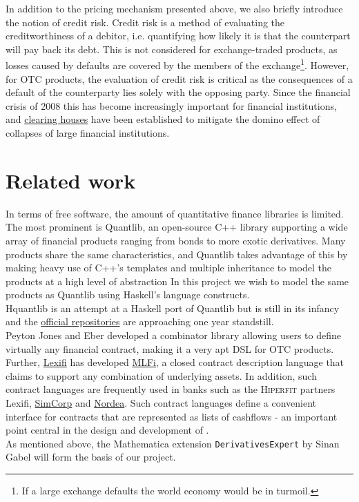 In addition to the pricing mechanism presented above, we also briefly introduce
the notion of credit risk. Credit risk is a method of evaluating the creditworthiness
of a debitor, i.e. quantifying how likely it is that the counterpart will pay back 
its debt. This is not considered for exchange-traded products, as losses 
caused by defaults are covered by the members of the exchange\footnote{If a large 
exchange defaults the world economy would be in turmoil.}. However, for OTC
products, the evaluation of credit risk is critical as the consequences of a 
default of the counterparty lies solely with the opposing party. Since the 
financial crisis of 2008 this has become increasingly important for financial 
institutions, and \href{http://www.lchclearnet.com/}{clearing houses} have
been established to mitigate the 
domino effect of collapses of large financial institutions.

\section{Related work}

In terms of free software, the amount of quantitative finance libraries is 
limited.
The most prominent is Quantlib, an open-source C++ library\cite{Ame2003}
supporting a wide array of financial products ranging from bonds to more 
exotic derivatives. Many products share the same characteristics, and
Quantlib takes advantage of this by making heavy use of C++'s templates 
and multiple  inheritance to model the products at a high level of 
abstraction\cite{implql}
In this project we wish to model the same products as Quantlib using Haskell's
language constructs.\\

Hquantlib\cite{hquantlib} is an attempt at a Haskell port of Quantlib
but is still in its infancy and the
\href{https://github.com/paulrzcz/hquantlib/tree/master}{official repositories}
are approaching one year standstill.\\

Peyton Jones and Eber\cite{composingcontracts} developed a combinator library 
allowing users to define virtually any financial contract, making it a very
apt DSL for OTC products. Further, \href{http://www.lexifi.com/}{Lexifi} has developed 
\href{http://www.lexifi.com/product/technology/contract-description-language}{MLFi},
a closed contract description language that claims to support any combination of
underlying assets. In addition, such contract languages are frequently used in
banks such as the \textsc{Hiperfit} partners Lexifi, \href{www.simcorp.com}{SimCorp}
and \href{www.nordea.com}{Nordea}. Such contract languages define a convenient
interface for contracts that are represented as lists of cashflows - an
important point central in the design and development of \hql.\\

As mentioned above, the Mathematica extension
\texttt{DerivativesExpert}\cite{Mathematica:DerivativesExpert} by Sinan Gabel
will form the basis of our project.

